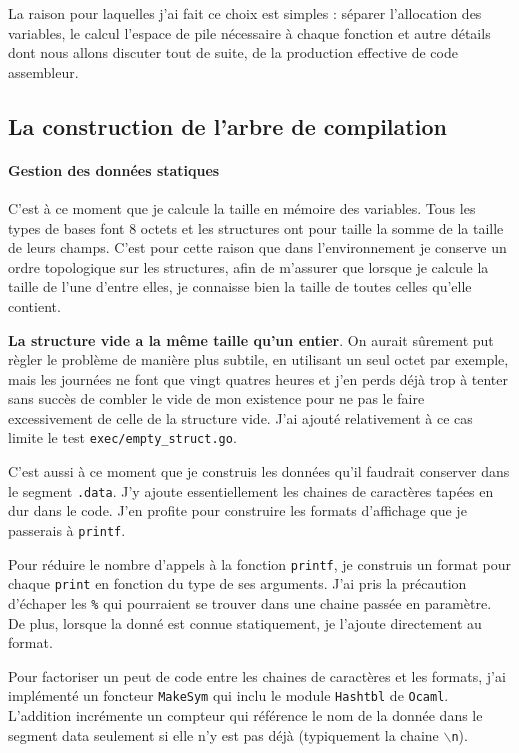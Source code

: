 \documentclass[11pt]{article}
\begin{document}
La raison pour laquelles j'ai fait ce choix est simples : séparer l'allocation des variables, le calcul l'espace de pile nécessaire à chaque fonction et autre détails dont nous allons discuter tout de suite, de la production effective de code assembleur.

\subsection{La construction de l'arbre de compilation}

\paragraph{Gestion des données statiques}

C'est à ce moment que je calcule la taille en mémoire des variables. Tous les types de bases font 8 octets et les structures ont pour taille la somme de la taille de leurs champs. C'est pour cette raison que dans l'environnement je conserve un ordre topologique sur les structures, afin de m'assurer que lorsque je calcule la taille de l'une d'entre elles, je connaisse bien la taille de toutes celles qu'elle contient.

\textbf{La structure vide a la même taille qu'un entier}. On aurait sûrement put règler le problème de manière plus subtile, en utilisant un seul octet par exemple, mais les journées ne font que vingt quatres heures et j'en perds déjà trop à tenter sans succès de combler le vide de mon existence pour ne pas le faire excessivement de celle de la structure vide. J'ai ajouté relativement à ce cas limite le test \texttt{exec/empty\_struct.go}.

C'est aussi à ce moment que je construis les données qu'il faudrait conserver dans le segment \texttt{.data}. J'y ajoute essentiellement les chaines de caractères tapées en dur dans le code. J'en profite pour construire les formats d'affichage que je passerais à \texttt{printf}.

Pour réduire le nombre d'appels à la fonction \texttt{printf}, je construis un format pour chaque \texttt{print} en fonction du type de ses arguments. J'ai pris la précaution d'échaper les \texttt{\%} qui pourraient se trouver dans une chaine passée en paramètre. De plus, lorsque la donné est connue statiquement, je l'ajoute directement au format.

Pour factoriser un peut de code entre les chaines de caractères et les formats, j'ai implémenté un foncteur \texttt{MakeSym} qui inclu le module \texttt{Hashtbl} de \texttt{Ocaml}. L'addition incrémente un compteur qui référence le nom de la donnée dans le segment data seulement si elle n'y est pas déjà (typiquement la chaine \(\backslash\)\texttt{n}).
\end{document}
